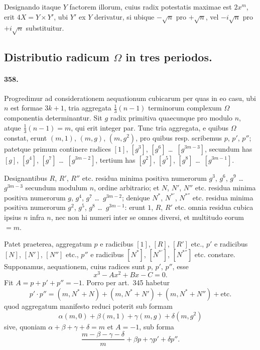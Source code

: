 \documentclass[12pt,a4paper]{article}
\theoremstyle{plain}
\theoremstyle{definition}
\theoremstyle{remark}
\begin{document}
Designando itaque $Y$ factorem illorum, cuius radix potestatis maximae est
$2x^m$, erit $4X = Y \times Y'$, ubi $Y'$ ex $Y$ derivatur, si ubique $-\sqrt{n}$
pro $+\sqrt{n}$, vel $-i\sqrt{n}$ pro $+i\sqrt{n}$ substituitur.


\subsection*{Distributio radicum $\Omega$ in tres periodos.}

\paragraph{358.}
Progredimur ad considerationem aequationum cubicarum per quas in eo casu,
ubi $n$ est formae $3k+1$, tria aggregata $\frac{1}{3}(n-1)$ terminorum complexum
$\Omega$ componentia determinantur. Sit $g$ radix primitiva quaecunque pro modulo
$n$, atque $\frac{1}{3}(n-1) = m$, qui erit integer par. Tunc tria aggregata, e
quibus $\Omega$ constat, erunt $(m,1)$, $(m,g)$, $(m,g^2)$, pro quibus resp.
scribemus $p$, $p'$, $p''$; patetque primum continere radices $[1]$,
$[g^3]$, $[g^6]$ \ldots\ $[g^{3m-3}]$, secundum has $[g]$, $[g^4]$,
$[g^7]$ \ldots\ $[g^{3m-2}]$, tertium has $[g^2]$, $[g^5]$,
$[g^8]$ \ldots\ $[g^{3m-1}]$.

Designantibus $R$, $R'$, $R''$ etc. residua minima positiva numerorum
$g^3$, $g^6$, $g^9$ \ldots\ $g^{3m-3}$ secundum modulum $n$, ordine arbitrario;
et $N$, $N'$, $N''$ etc. residua minima positiva numerorum $g$, $g^4$,
$g^7$ \ldots\ $g^{3m-2}$; denique $N^*$, $N^{*'}$, $N^{*''}$ etc. residua
minima positiva numerorum $g^2$, $g^5$, $g^8$ \ldots\ $g^{3m-1}$: erunt
$1$, $R$, $R'$ etc. omnia residua cubica ipsius $n$ infra $n$, nec non hi
numeri inter se omnes diversi, et multitudo eorum $= m$.

Patet praeterea, aggregatum $p$ e radicibus $[1]$, $[R]$, $[R']$ etc.,
$p'$ e radicibus $[N]$, $[N']$, $[N'']$ etc., $p''$ e radicibus $[N^*]$,
$[N^{*'}]$, $[N^{*''}]$ etc. constare. Supponamus, aequationem, cuius
radices sunt $p$, $p'$, $p''$, esse
\[
x^3 - Ax^2 + Bx - C = 0.
\]
Fit $A = p + p' + p'' = -1$. Porro per art.~345 habetur
\[
p' \cdot p'' = (m, N^*+N) + (m, N^*+N') + (m, N^*+N'') + \text{etc.}
\]
quod aggregatum manifesto reduci poterit sub formam
\[
\alpha(m,0) + \beta(m,1) + \gamma(m,g) + \delta(m,g^2)
\]
sive, quoniam $\alpha + \beta + \gamma + \delta = m$ et $A = -1$, sub forma
\[
\frac{m - \beta - \gamma - \delta}{m} + \beta p + \gamma p' + \delta p''.
\]
\end{document}
